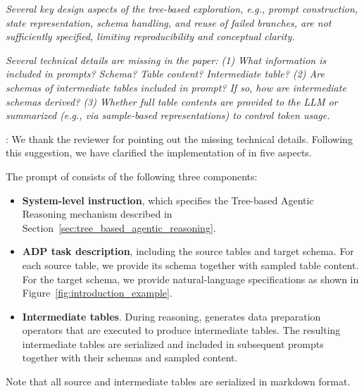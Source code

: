 
\begin{shaded}
{
 \emph{Several key design aspects of the tree-based exploration, e.g., prompt construction, state representation, schema handling, and reuse of failed branches, are not sufficiently specified, limiting reproducibility and conceptual clarity.}

 \emph{Several technical details are missing in the paper:
(1) What information is included in prompts? Schema? Table content? Intermediate table?
(2) Are schemas of intermediate tables included in prompt? If so, how are intermediate schemas derived?
(3) Whether full table contents are provided to the LLM or summarized (e.g., via sample-based representations) to control token usage.}
}
\end{shaded}

:
We thank the reviewer for pointing out the missing technical details. Following this suggestion, we have clarified the implementation of \sys in five aspects.


The prompt of \sys consists of the following three components:
\begin{itemize}[leftmargin=*]
\item \textbf{System-level instruction}, which specifies the Tree-based Agentic Reasoning mechanism described in Section~\ref{sec:tree_based_agentic_reasoning}.
%
\item \textbf{ADP task description}, including the source tables and target schema. For each source table, we provide its schema together with sampled table content. For the target schema, we provide natural-language specifications as shown in Figure~\ref{fig:introduction_example}.
%
\item \textbf{Intermediate tables}. During reasoning, \sys generates data preparation operators that are executed to produce intermediate tables. The resulting intermediate tables are serialized and included in subsequent prompts together with their schemas and sampled content.
\end{itemize}
Note that all source and intermediate tables are serialized in markdown format.

